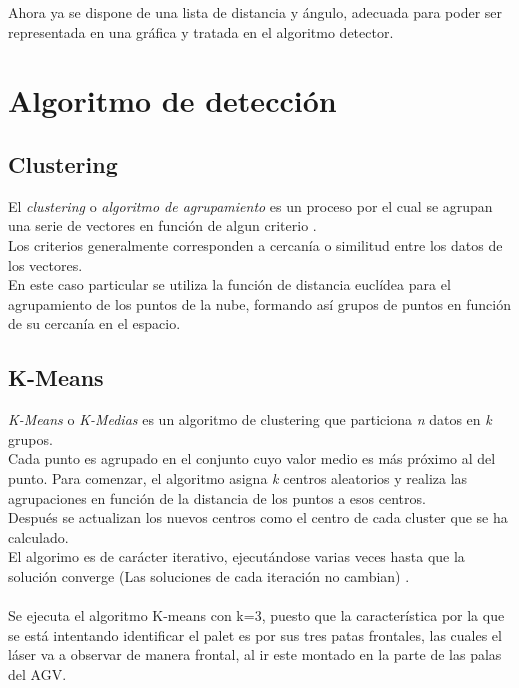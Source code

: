 	Ahora ya se dispone de una lista de distancia y ángulo, adecuada para poder ser representada en una gráfica y tratada en el algoritmo detector.\\


\section{Algoritmo de detección}

	\subsection{Clustering}
	El \emph{clustering} o \emph{algoritmo de agrupamiento} es un proceso por el cual se agrupan una serie de vectores en función de algun criterio \cite{wiki:clustering} .\\ 
Los criterios generalmente corresponden a cercanía o similitud entre los datos de los vectores.\\
En este caso particular se utiliza la función de distancia euclídea para el agrupamiento de los puntos de la nube, formando así grupos de puntos en función de su cercanía en el espacio.\\

		\subsection{K-Means}
		\emph{K-Means} o \emph{K-Medias} es un algoritmo de clustering que particiona \textit{n} datos en \textit{k} grupos.\\
Cada punto es agrupado en el conjunto cuyo valor medio es más próximo al del punto.
		Para comenzar, el algoritmo asigna \textit{k} centros aleatorios y realiza las agrupaciones en función de la distancia de los puntos a esos centros.\\
Después se actualizan los nuevos centros como el centro de cada cluster que se ha calculado.\\

		El algorimo es de carácter iterativo, ejecutándose varias veces hasta que la solución converge (Las soluciones de cada iteración no cambian) \cite{wiki:kmeans} .\\ \\

Se ejecuta el algoritmo K-means con k=3, puesto que la característica por la que se está intentando identificar el palet es por sus tres patas frontales, las cuales el láser va a observar de manera frontal, al ir este montado en la parte de las palas del AGV. \\

